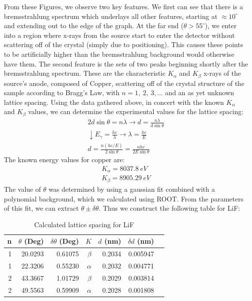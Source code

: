 \documentclass[%
 reprint,
 amsmath,amssymb,
 aps,
 pra,
]{revtex4-1}
\begin{document}
From these Figures, we observe two key features. We first can see that there is a bremsstrahlung spectrum which underlays all other features, starting at $\approx10^\circ$ and extending out to the edge of the graph. At the far end ($\theta > 55^\circ$), we enter into a region where x-rays from the source start to enter the detector without scattering off of the crystal (simply due to positioning). This causes these points to be artificially higher than the bremsstrahlung background would otherwise have them. The second feature is the sets of two peaks beginning shortly after the bremsstrahlung spectrum. These are the characteristic $K_\alpha$ and $K_\beta$ x-rays of the source's anode, composed of Copper, scattering off of the crystal structure of the sample according to Bragg's Law, with $n = 1,~2,~3,...$ and an as yet unknown lattice spacing. Using the data gathered above, in concert with the known $K_\alpha$ and $K_\beta$ values, we can determine the experimental values for the lattice spacing:
\begin{gather}
	2d\sin{\theta} = n\lambda \rightarrow d = \frac{n\lambda}{d\sin{\theta}} \nonumber \\
	\downarrow E_\gamma = \frac{hc}{\lambda} \rightarrow \lambda = \frac{hc}{E} \nonumber \\
	d = \frac{n (hc/E)}{2 \sin{\theta}} = \frac{nhc}{2E\sin{\theta}}
\end{gather}
The known energy values for copper are\cite{database1, database2}:
\begin{gather}
	K_\alpha = 8037.8 ~eV \nonumber \\
	K_\beta = 8905.29 ~eV \nonumber
\end{gather}
The value of $\theta$ was determined by using a gaussian fit combined with a polynomial background, which we calculated using ROOT. From the parameters of this fit, we can extract $\theta \pm \delta \theta$. Thus we construct the following table for LiF:
\begin{table}[htbp]
	\begin{center}
	\begin{tabular}{|r|r|r|r|r|r|l|}
		\hline
		n & $\theta$ (Deg) & $\delta \theta$ (Deg) & $K$ &  $d$ (nm) & \multicolumn{1}{r|}{$\delta d$ (nm)} \\ \hline
		1 & 20.0293 & 0.61075 & $\beta$ &  0.2034 & 0.005947 \\ \hline
		1 & 22.3206 & 0.55230 & $\alpha$ &  0.2032 & 0.004771 \\ \hline
		2 & 43.3667 & 1.01729 & $\beta$ &  0.2029 & 0.003814 \\ \hline
		2 & 49.5563 & 0.59909 & $\alpha$ &  0.2028 & 0.001808 \\ \hline
	\end{tabular}
	\end{center}
	\caption{Calculated lattice spacing for LiF}
	\label{table:LiF}
\end{table}
\end{document}
